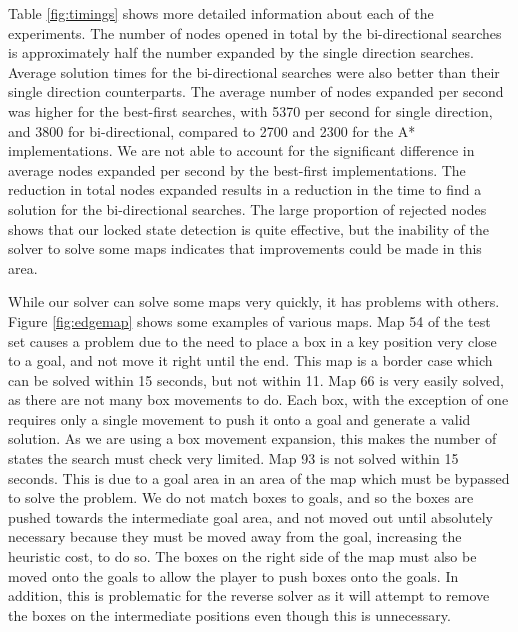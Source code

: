 \documentclass[a4paper,11pt]{article}
\begin{document}
Table \ref{fig:timings} shows more detailed information about each of the
experiments. The number of nodes opened in total by the bi-directional searches
is approximately half the number expanded by the single direction
searches. Average solution times for the bi-directional searches were also
better than their single direction counterparts. The average number of nodes
expanded per second was higher for the best-first searches, with 5370 per second
for single direction, and 3800 for bi-directional, compared to 2700 and 2300 for
the A* implementations. We are not able to account for the significant
difference in average nodes expanded per second by the best-first
implementations. The reduction in total nodes expanded results in a reduction in
the time to find a solution for the bi-directional searches. The large
proportion of rejected nodes shows that our locked state detection is quite
effective, but the inability of the solver to solve some maps indicates that
improvements could be made in this area.

While our solver can solve some maps very quickly, it has problems with
others. Figure \ref{fig:edgemap} shows some examples of various maps. Map 54 of the
test set causes a problem due to the need to place a box in a key position very
close to a goal, and not move it right until the end. This map is a border case
which can be solved within 15 seconds, but not within 11. Map 66 is very easily
solved, as there are not many box movements to do. Each box, with the exception
of one requires only a single movement to push it onto a goal and generate a
valid solution. As we are using a box movement expansion, this makes the number
of states the search must check very limited. Map 93 is not solved within 15
seconds. This is due to a goal area in an area of the map which must be bypassed
to solve the problem. We do not match boxes to goals, and so the boxes are
pushed towards the intermediate goal area, and not moved out until absolutely
necessary because they must be moved away from the goal, increasing the
heuristic cost, to do so. The boxes on the right side of the map must also be
moved onto the goals to allow the player to push boxes onto the goals. In
addition, this is problematic for the reverse solver as it will attempt to
remove the boxes on the intermediate positions even though this is unnecessary.
\end{document}
